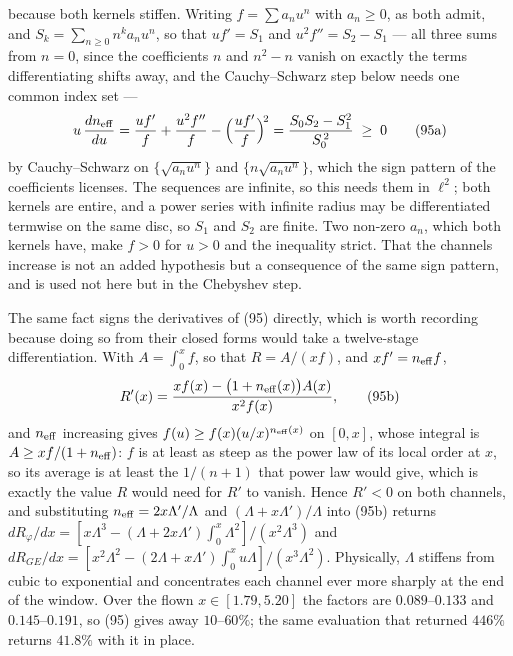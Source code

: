 \documentclass[10pt]{article}
\begin{document}
because both kernels stiffen. Writing $f = \sum a_nu^n$ with $a_n\ge0$,
as both admit, and $S_k = \sum_{n\ge0} n^ka_nu^n$, so that $uf' = S_1$
and $u^2f'' = S_2 - S_1$ --- all three sums from $n = 0$, since the
coefficients $n$ and $n^2 - n$ vanish on exactly the terms
differentiating shifts away, and the Cauchy--Schwarz step below needs
one common index set ---
\begin{equation}
  u\,\frac{dn_{\rm eff}}{du}
  = \frac{uf'}{f} + \frac{u^2f''}{f} - \Bigl(\frac{uf'}{f}\Bigr)^{\!2}
  = \frac{S_0S_2 - S_1^2}{S_0^{\,2}} \;\ge\; 0
  \tag{95a}
\end{equation}
by Cauchy--Schwarz on $\{\sqrt{a_nu^n}\}$ and $\{n\sqrt{a_nu^n}\}$,
which the sign pattern of the coefficients licenses. The sequences are
infinite, so this needs them in $\ell^2$; both kernels are entire, and
a power series with infinite radius may be differentiated termwise on
the same disc, so $S_1$ and $S_2$ are finite. Two non-zero
$a_n$, which both kernels have, make $f>0$ for $u>0$ and the inequality
strict. That the channels increase is not an added hypothesis but a
consequence of the same sign pattern, and is used not here but in the
Chebyshev step.

The same fact signs the derivatives of (95) directly, which is worth
recording because doing so from their closed forms would take a
twelve-stage differentiation. With $A = \int_0^x\!f$, so that
$R = A/(xf)$, and $xf' = n_{\rm eff}f$,
\begin{equation}
  R'(x) = \frac{x f(x) - \bigl(1 + n_{\rm eff}(x)\bigr)A(x)}{x^2f(x)} ,
  \tag{95b}
\end{equation}
and $n_{\rm eff}$ increasing gives $f(u)\ge f(x)(u/x)^{n_{\rm eff}(x)}$
on $[0,x]$, whose integral is $A\ge xf/(1+n_{\rm eff})$: $f$ is at
least as steep as the power law of its local order at $x$, so its
average is at least the $1/(n{+}1)$ that power law would give, which is
exactly the value $R$ would need for $R'$ to vanish. Hence $R'<0$ on
both channels, and substituting $n_{\rm eff} = 2x\Lambda'/\Lambda$ and
$(\Lambda + x\Lambda')/\Lambda$ into (95b) returns
$dR_\varphi/dx = [x\Lambda^3 - (\Lambda + 2x\Lambda')\!\int_0^x\!
\Lambda^2]/(x^2\Lambda^3)$ and $dR_{GE}/dx = [x^2\Lambda^2 - (2\Lambda
+ x\Lambda')\!\int_0^x\!u\Lambda]/(x^3\Lambda^2)$. Physically,
$\Lambda$ stiffens from cubic to exponential and concentrates each
channel ever more sharply at the end of the window. Over the flown
$x\in[1.79,5.20]$ the factors are $0.089$--$0.133$ and
$0.145$--$0.191$, so (95) gives away $10$--$60\%$; the same evaluation
that returned $446\%$ returns $41.8\%$ with it in place.
\end{document}
